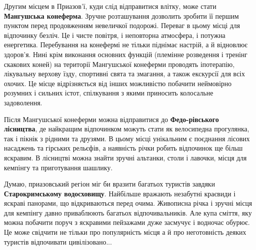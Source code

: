 
Другим місцем в Приазов'ї, куди слід відправитися влітку, може стати \textbf{Мангушська
конеферма}. Зручне розташування дозволить зробити її першим пунктом перед
продовженням невеличкої подорожі. Переваг в цьому місці для відпочинку безліч.
Це і чисте повітря, і неповторна атмосфера, і потужна енергетика. Перебування
на конефермі не тільки піднімає настрій, а й відновлює здоров'я. Нині крім
виконання основних функцій (племінне розведення і тренінг скакових коней) на
території Мангушської конеферми проводять іпотерапію, лікувальну верхову їзду,
спортивні свята та змагання, а також екскурсії для всіх охочих. Це місце
відрізняється від інших можливістю побачити неймовірно розумних і сильних
істот, спілкування з якими приносить колосальне задоволення.


Після Мангушської конеферми можна відправитися до \textbf{Федо\hyp{}рівського лісництва}, де
найкращим відпочинком можуть стати як велосипедна прогулянка, так і пікнік з
рідними та друзями. В цьому місці унікальним є поєднання лісових насаджень та
гірських рельєфів, а наявність річки робить відпочинок ще більш яскравим. В
лісництві можна знайти зручні альтанки, столи і лавочки, місця для кемпінгу та
приготування шашлику.


Думаю, приазовський регіон міг би вразити багатьох туристів завдяки
\textbf{Старокримському водосховищу}. Найбільше вражають незабутні краєвиди і яскраві
панорами, що відкриваються перед очима. Живописна річка і зручні місця для
кемпінгу давно приваблюють багатьох відпочивальників. Але купа сміття, яку
можна побачити поруч з яскравими пейзажами дуже засмучує і водночас обурює. Це
може свідчити не тільки  про популярність місця а й про неготовність деяких
туристів відпочивати цивілізовано... 



